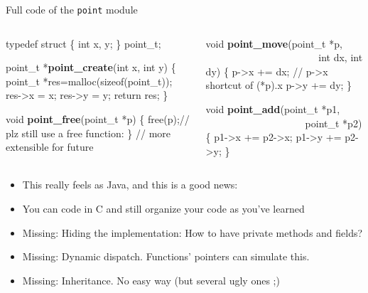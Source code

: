 \begin{frame}[fragile]{Full code of the \texttt{point} module}
  \begin{columns}
    \begin{column}{.45\linewidth}
      \begin{boitecode}{}
typedef struct \{
  int x, y;
\} point_t;              
      \end{boitecode}

      \begin{boitecode}{point\_t *{\bf point\_create}(int x, int y) \{}
  point_t *res=malloc(sizeof(point_t));
  res->x = x;
  res->y = y;
  return res;
\}
      \end{boitecode}

      \medskip
      \begin{boitecode}{void {\bf point\_free}(point\_t *p) \{}
  free(p);// plz still use a free function: 
\}         // more extensible for future
      \end{boitecode}
    \end{column}
    \begin{column}{.45\linewidth}
      \begin{boitecode}{void {\bf point\_move}(point\_t *p,\\
          \null~~~~~~~~~~~~~~~~~~~~~~ int dx, int dy) \{}
  p->x += dx; // p->x shortcut of (*p).x
  p->y += dy;
\}
      \end{boitecode}
      \medskip
      \begin{boitecode}{void {\bf point\_add}(point\_t *p1,\\
          \null~~~~~~~~~~~~~~~~~~~~point\_t *p2) \{}
  p1->x += p2->x;
  p1->y += p2->y;
\}
      \end{boitecode}
  \end{column}
  \end{columns}

  \begin{itemize}
  \item This really feels as Java, and this is a good news:
  \item You can code in C and still organize your code as you've learned

    \bigskip
  \item Missing: Hiding the implementation: How to have private methods and fields?
  \item Missing: Dynamic dispatch. Functions' pointers can simulate this.
  \item Missing: Inheritance. No easy way (but several ugly ones ;)
  \end{itemize}
\end{frame}
